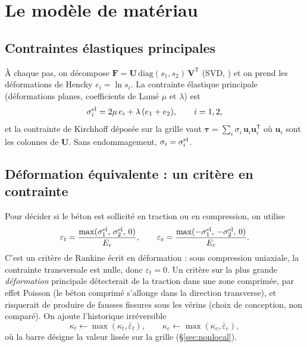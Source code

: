 \documentclass[11pt,a4paper]{article}
\newcommand{\code}[1]{\texttt{\detokenize{#1}}}
\newcommand{\bm}[1]{\boldsymbol{#1}}
\begin{document}
\section{Le modèle de matériau}

\subsection{Contraintes élastiques principales}

À chaque pas, on décompose $\mathbf F = \mathbf U\,\mathrm{diag}(s_1, s_2)\,\mathbf V^{\mathsf T}$ (SVD,
\code{ti.svd}) et on prend les déformations de Hencky $e_i = \ln s_i$. La contrainte élastique
principale (déformations planes, coefficients de Lamé $\mu$ et $\lambda$) est
\begin{equation}
  \sigma_i^{\rm el} = 2\mu\, e_i + \lambda\,(e_1 + e_2),\qquad i = 1, 2 ,
\end{equation}
et la contrainte de Kirchhoff déposée sur la grille vaut $\bm\tau = \sum_i \sigma_i\,\mathbf u_i\mathbf u_i^{\mathsf T}$
où $\mathbf u_i$ sont les colonnes de $\mathbf U$. Sans endommagement, $\sigma_i = \sigma_i^{\rm el}$.

\subsection{Déformation équivalente : un critère en contrainte}

Pour décider si le béton est sollicité en traction ou en compression, on utilise
\begin{equation}
  \varepsilon_t = \frac{\max(\sigma_1^{\rm el},\, \sigma_2^{\rm el},\, 0)}{E_c},
  \qquad
  \varepsilon_c = \frac{\max(-\sigma_1^{\rm el},\, -\sigma_2^{\rm el},\, 0)}{E_c}.
\end{equation}
C'est un critère de Rankine écrit en déformation : sous compression uniaxiale, la contrainte
transversale est nulle, donc $\varepsilon_t = 0$. Un critère sur la plus grande \emph{déformation}
principale détecterait de la traction dans une zone comprimée, par effet Poisson (le béton comprimé
s'allonge dans la direction transverse), et risquerait de produire de fausses fissures sous les
vérins (choix de conception, non comparé). On ajoute l'historique irréversible
\begin{equation}
  \kappa_t \leftarrow \max(\kappa_t, \bar\varepsilon_t),\qquad
  \kappa_c \leftarrow \max(\kappa_c, \bar\varepsilon_c),
\end{equation}
où la barre désigne la valeur lissée sur la grille (\S\ref{sec:nonlocal}).
\end{document}
